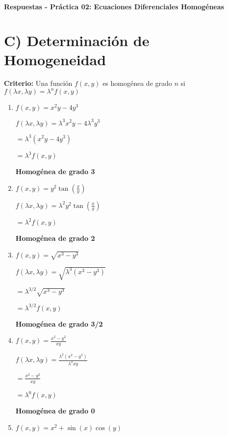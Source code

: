 \documentclass[a4paper,12pt]{article}
\begin{document}
\begin{center}
    \Large\textbf{Respuestas - Práctica 02: Ecuaciones Diferenciales Homogéneas}\\[1cm]  
\end{center}

\section*{C) Determinación de Homogeneidad}

\textbf{Criterio:} Una función $f(x,y)$ es homogénea de grado $n$ si $f(\lambda x, \lambda y) = \lambda^n f(x,y)$

\begin{enumerate}
    \item $f(x,y) = x^2y - 4y^3$
    
    $f(\lambda x, \lambda y) = \lambda^3 x^2y - 4\lambda^3 y^3$
    
    $= \lambda^3(x^2y - 4y^3)$
    
    $= \lambda^3 f(x,y)$
    
    \textbf{Homogénea de grado 3}

    \item $f(x,y) = y^2\tan\left(\frac{x}{y}\right)$
    
    $f(\lambda x, \lambda y) = \lambda^2 y^2\tan\left(\frac{x}{y}\right)$
    
    $= \lambda^2 f(x,y)$
    
    \textbf{Homogénea de grado 2}

    \item $f(x,y) = \sqrt{x^3 - y^3}$
    
    $f(\lambda x, \lambda y) = \sqrt{\lambda^3(x^3 - y^3)}$
    
    $= \lambda^{3/2}\sqrt{x^3 - y^3}$
    
    $= \lambda^{3/2} f(x,y)$
    
    \textbf{Homogénea de grado 3/2}

    \item $f(x,y) = \frac{x^2 - y^2}{xy}$
    
    $f(\lambda x, \lambda y) = \frac{\lambda^2(x^2 - y^2)}{\lambda^2 xy}$
    
    $= \frac{x^2 - y^2}{xy}$
    
    $= \lambda^0 f(x,y)$
    
    \textbf{Homogénea de grado 0}

    \item $f(x,y) = x^2 + \sin(x)\cos(y)$
    

\end{enumerate}
\end{document}
